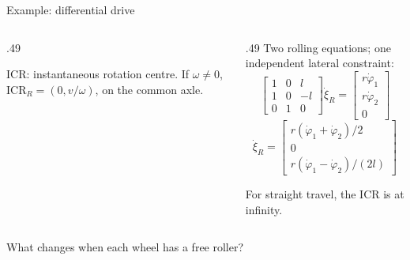 \documentclass[aspectratio=169]{beamer}
\begin{document}
\begin{frame}[t]{Example: differential drive}
\small
\vspace{-6mm}
\begin{columns}[T,onlytextwidth]\begin{column}{.49\textwidth}
\centering
{}\par\small ICR: instantaneous rotation centre. If $\omega\ne0$, $\mathrm{ICR}_R=(0,v/\omega)$, on the common axle.


\end{column}\begin{column}{.49\textwidth}
Two rolling equations; one independent lateral constraint:
\[\begin{bmatrix}1&0&l\\1&0&-l\\0&1&0\end{bmatrix}\dot\xi_R=\begin{bmatrix}r\dot\varphi_1\\r\dot\varphi_2\\0\end{bmatrix}\]
\[\dot\xi_R=\begin{bmatrix}r(\dot\varphi_1+\dot\varphi_2)/2\\0\\r(\dot\varphi_1-\dot\varphi_2)/(2l)\end{bmatrix}\]
\small \par For straight travel, the ICR is at infinity.

\end{column}\end{columns}
\par\vspace{2mm}\small What changes when each wheel has a free roller?
\end{frame}
\end{document}
